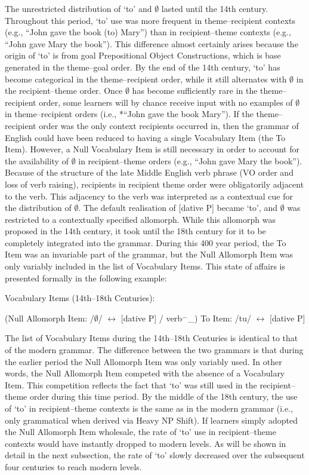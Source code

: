 	The unrestricted distribution of `to' and $\emptyset$ lasted until the 14th century. Throughout this period, `to' use was more frequent in theme--recipient contexts (e.g., ``John gave the book (to) Mary'') than in recipient--theme contexts (e.g., ``John gave Mary the book''). This difference almost certainly arises because the origin of `to' is from goal Prepositional Object Constructions, which is base generated in the theme--goal order. By the end of the 14th century, `to' has become categorical in the theme--recipient order, while it still alternates with $\emptyset$ in the recipient--theme order. Once $\emptyset$ has become sufficiently rare in the theme--recipient order, some learners will by chance receive input with no examples of $\emptyset$ in theme--recipient orders (i.e., *``John gave the book Mary''). 
	If the theme--recipient order was the only context recipients occurred in, then the grammar of English could have been reduced to having a single Vocabulary Item (the To Item). However, a Null Vocabulary Item is still necessary in order to account for the availability of $\emptyset$ in recipient--theme orders (e.g., ``John gave Mary the book''). Because of the structure of the late Middle English verb phrase (VO order and loss of verb raising), recipients in recipient theme order were obligatorily adjacent to the verb. This adjacency to the verb was interpreted as a contextual cue for the distribution of $\emptyset$. The default realisation of [dative P] became `to', and $\emptyset$ was restricted to a contextually specified allomorph. While this allomorph was proposed in the 14th century, it took until the 18th century for it to be completely integrated into the grammar. During this 400 year period, the To Item was an invariable part of the grammar, but the Null Allomorph Item was only variably included in the list of Vocabulary Items. This state of affairs is presented formally in the following example:

	\begin{exe}
		\ex Vocabulary Items (14th--18th Centuries):
		\begin{xlist}
			\ex (Null Allomorph Item: /$\emptyset$/ $\leftrightarrow$ [dative P] / verb$^{\smallfrown}$\_)
			\ex To Item: /tu/ $\leftrightarrow$ [dative P]
		\end{xlist}
	\end{exe}

	The list of Vocabulary Items during the 14th--18th Centuries is identical to that of the modern grammar. The difference between the two grammars is that during the earlier period the Null Allomorph Item was only variably used. In other words, the Null Allomorph Item competed with the absence of a Vocabulary Item. This competition reflects the fact that `to' was still used in the recipient--theme order during this time period. By the middle of the 18th century, the use of `to' in recipient--theme contexts is the same as in the modern grammar (i.e., only grammatical when derived via Heavy NP Shift). If learners simply adopted the Null Allomorph Item wholesale, the rate of `to' use in recipient--theme contexts would have instantly dropped to modern levels. As will be shown in detail in the next subsection, the rate of `to' slowly decreased over the subsequent four centuries to reach modern levels.
	
